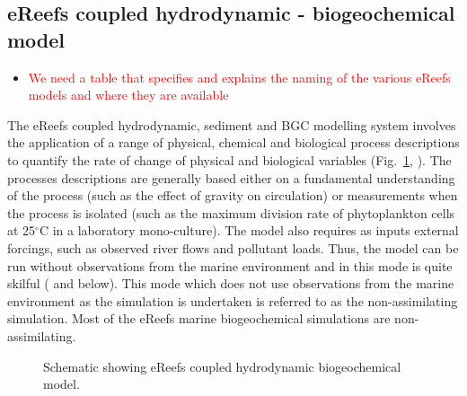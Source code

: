 \subsection[eReefs coupled hydrodynamic]{eReefs coupled hydrodynamic - biogeochemical model}\label{sec:eReefs}

\begin{itemize}
\item \textcolor{red}{We need a table that specifies and explains the naming of the various
    eReefs models and where they are available}
\end{itemize}

The eReefs coupled hydrodynamic, sediment and BGC modelling system involves the application of a
range of physical, chemical and biological process descriptions to quantify the rate of change of
physical and biological variables (Fig.~\ref{fig:bgc}, \citet{Schiller14}). The processes
descriptions are generally based either on a fundamental understanding of the process (such as the
effect of gravity on circulation) or measurements when the process is isolated (such as the maximum
division rate of phytoplankton cells at 25$^{\circ}$C in a laboratory mono-culture). The model also
requires as inputs external forcings, such as observed river flows and pollutant loads. Thus, the
model can be run without observations from the marine environment and in this mode is quite skilful
(\citet{Skerratt18} and below). This mode which does not use observations from the marine
environment as the simulation is undertaken is referred to as the non-assimilating simulation. Most
of the eReefs marine biogeochemical simulations are non-assimilating.

\begin{figure}[thb]
\begin{center}
\caption{Schematic showing eReefs coupled hydrodynamic biogeochemical model.}
\label{fig:bgc}
\end{center}
\end{figure}

